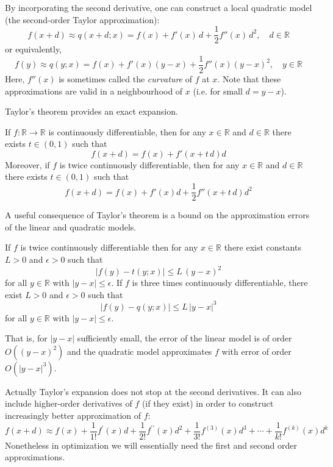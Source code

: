 By incorporating the second derivative, one can construct a local quadratic model (the second-order Taylor approximation):
\begin{equation}
f(x+d)\approx q(x+d;x)=f(x)+f'(x)\,d+\frac{1}{2}f''(x)\,d^2,\quad d\in\mathbb{R}
\end{equation}
or equivalently,
\begin{equation}\label{eq:second_order_taylor_approximation_univariate}
f(y)\approx q(y;x)=f(x)+f'(x)(y-x)+\frac{1}{2}f''(x)(y-x)^2,\quad y\in\mathbb{R}
\end{equation}
Here, \(f''(x)\) is sometimes called the \emph{curvature} of \(f\) at \(x\). Note that these approximations are valid in a neighbourhood of \(x\) (i.e. for small \(d=y-x\)).

Taylor's theorem provides an exact expansion. 

\begin{theorem}
\label{thm:univariate_taylor_expansion}
If \(f:\mathbb{R}\to\mathbb{R}\) is continuously differentiable, then for any \(x\in\mathbb{R}\) and \(d\in\mathbb{R}\) there exists \(t\in (0,1)\) such that
\[
f(x+d)=f(x)+f'\left(x+t\,d\right)d
\]
Moreover, if \(f\) is twice continuously differentiable, then for any \(x\in\mathbb{R}\) and \(d\in\mathbb{R}\) there exists \(t\in (0,1)\) such that
\[
f(x+d)=f(x)+f'(x)d+\frac{1}{2}f''\left(x+t\,d\right)d^2
\]
\end{theorem}

A useful consequence of Taylor's theorem is a bound on the approximation errors of the linear and quadratic models.

\begin{corollary}
\label{cor:approximation_error_univariate_taylor}  
If \(f\) is twice continuously differentiable then for any \(x\in\mathbb{R}\) there exist constants \(L>0\) and \(\epsilon>0\) such that
\[
\left|f(y)-t(y;x)\right|\le L\,(y-x)^2
\]
for all \(y\in\mathbb{R}\) with \(|y-x|\le\epsilon\). If \(f\) is three times continuously differentiable, there exist \(L>0\) and \(\epsilon>0\) such that
\[
\left|f(y)-q(y;x)\right|\le L\,|y-x|^3
\]
for all \(y\in\mathbb{R}\) with \(|y-x|\le\epsilon\).
\end{corollary}

That is, for \(|y-x|\) sufficiently small, the error of the linear model is of order \(O\left((y-x)^2\right)\) and the quadratic model approximates \(f\) with error of order \(O\left(|y-x|^3\right)\).


Actually Taylor's expansion does not stop at the second derivatives. It can also include higher-order derivatives of $f$ (if they exist) in order to construct increasingly better approximation of $f$:
$$
f(x+d) \approx f(x)+\frac{1}{1!} f^{\prime}(x) d+\frac{1}{2!} f^{\prime \prime}(x) d^2+\frac{1}{3!} f^{(3)}(x) d^3+\cdots+\frac{1}{k!} f^{(k)}(x) d^k
$$
Nonetheless in optimization we will essentially need the first and second order approximations.

